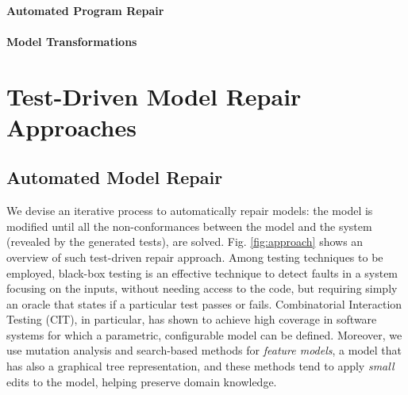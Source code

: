 \documentclass[
12pt, %
oneside, %
english, %
singlespacing, %
headsepline, %
consistentlayout, %
]{MastersDoctoralThesis} %
\theoremstyle{plain}
\theoremstyle{definition}
\theoremstyle{remark}
\theoremstyle{remark}
\theoremstyle{plain}
\theoremstyle{plain}
\theoremstyle{remark}
\begin{document}
\subsection{Automated Program Repair}
\subsection{Model Transformations}

\part{Test-Driven Model Repair Approaches}
\chapter{Automated Model Repair}

We devise an iterative process to automatically repair models: the model is modified until all the non-conformances between the model and the system (revealed by the generated tests), are solved. Fig. \ref{fig:approach} shows an overview of such test-driven repair approach. 
Among testing techniques to be employed, black-box testing is an effective technique to detect faults in a system focusing on the inputs, without needing access to the code, but requiring simply an oracle that states if a particular test %
passes or fails. 
Combinatorial Interaction Testing (CIT), in particular, has shown to achieve high coverage in software systems for which a parametric, configurable model can be defined. Moreover, we use mutation analysis and search-based methods for \textit{feature models}, a model that has also a graphical tree representation, and these methods tend to apply \textit{small} edits to the model, helping preserve domain knowledge.
\end{document}

